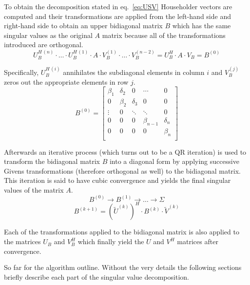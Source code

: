 To obtain the decomposition stated in eq.~\eqref{eq:USV} Householder
vectors are computed and their transformations are applied from the
left-hand side and right-hand side to obtain an upper bidiagonal
matrix $B$ which has the same singular values as the original $A$
matrix because all of the transformations introduced are orthogonal.
\begin{equation}
U_B^{H\,(n)}\cdot\ldots\cdot U_B^{H\,(1)}\cdot A\cdot
V_B^{(1)}\cdot\ldots\cdot V_B^{(n-2)}
= U_B^H\cdot A\cdot V_B = B^{(0)}
\end{equation}

Specifically, $U_B^{H\,(i)}$ annihilates the subdiagonal elements in
column $i$ and $V_B^{(j)}$ zeros out the appropriate elements in row
$j$.
\begin{equation}
B^{(0)} = 
\begin{bmatrix}
\beta_1 & \delta_2 & 0 & \cdots & 0\\
0 & \beta_2 & \delta_3 & 0 & 0\\
\vdots & 0 & \ddots & \ddots & 0\\
0 & 0 & 0 & \beta_{n-1} & \delta_n\\
0 & 0 & 0 & 0 & \beta_n\\
\end{bmatrix}
\end{equation}

Afterwards an iterative process (which turns out to be a QR iteration)
is used to transform the bidiagonal matrix $B$ into a diagonal form by
applying successive Givens transformations (therefore orthogonal as
well) to the bidiagonal matrix.  This iteration is said to have cubic
convergence and yields the final singular values of the matrix $A$.
\begin{equation}
B^{(0)} \rightarrow B^{(1)}\rightarrow \ldots \rightarrow \Sigma
\end{equation}
\begin{equation}
B^{(k+1)} = \left(\tilde{U}^{(k)}\right)^H\cdot B^{(k)}\cdot \tilde{V}^{(k)}
\end{equation}

Each of the transformations applied to the bidiagonal matrix is also
applied to the matrices $U_B$ and $V_B^H$ which finally yield the $U$
and $V^H$ matrices after convergence.

\addvspace{12pt}

So far for the algorithm outline.  Without the very details the
following sections briefly describe each part of the singular value
decomposition.

